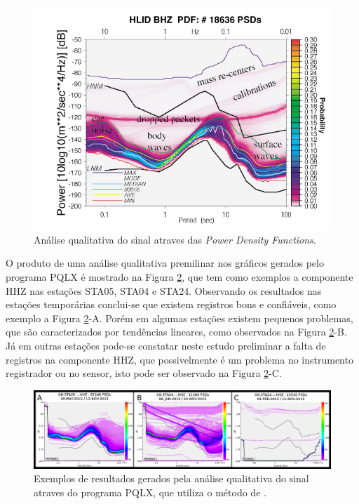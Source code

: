 \begin{figure}[!ht]
\centering
\includegraphics[scale=0.6]{mcnamura_buland.png}
\caption{Análise qualitativa do sinal atraves das \textit{Power Density Functions}. \cite{McNamara_Buland_2004} }
\label{PQLX}
\end{figure}

O produto de uma análise qualitativa premilinar nos gráficos gerados pelo programa PQLX é mostrado na Figura \ref{PQLX_results}, que tem como exemplos a componente HHZ nas estações STA05, STA04 e STA24. Observando os resultados nas estações temporárias conclui-se que existem registros bons e confiáveis, como exemplo a Figura \ref{PQLX_results}-A. Porém em algumas estações existem pequenos problemas, que são caracterizados por tendências lineares, como observados na Figura \ref{PQLX_results}-B. Já em outras estações pode-se constatar neste estudo preliminar a falta de registros na componente HHZ, que possivelmente é um problema no instrumento registrador ou no sensor, isto pode ser observado na Figura \ref{PQLX_results}-C.

\begin{figure}[!ht]
\centering
\includegraphics[scale=0.35]{pqlx_results.png}
\caption{Exemplos de resultados gerados pela análise qualitativa do sinal atraves do programa PQLX, que utiliza o método de \cite{McNamara_Buland_2004}.}
\label{PQLX_results}
\end{figure}

